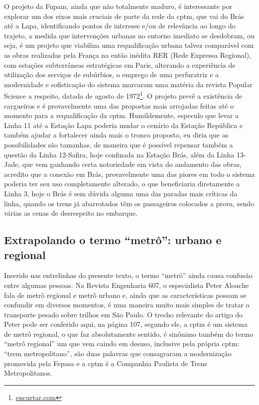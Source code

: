 \documentclass[11pt,fleqn]{book} %
\begin{document}
O projeto da Fupam, ainda que não totalmente maduro, é interessante por explorar um dos eixos mais cruciais de parte da rede da \gls{cptm}, que vai do Brás até a Lapa, identificando pontos de interesse e/ou de relevância ao longo do trajeto, a medida que intervenções urbanas no entorno imediato se desdobram, ou seja, é um projeto que viabiliza uma requalificação urbana talvez comparável com as obras realizadas pela França na então inédita RER (Rede Expressa Regional), com estações subterrâneas estratégicas em Paris, alterando a experiência de utilização dos serviços de subúrbios, o emprego de uma perfuratriz e a modernidade e sofisticação do sistema marcaram uma matéria da revista Popular Science a respeito, datada de agosto de 1972\footnote{\url{encurtar.com}}. O projeto prevê a existência de cargueiros e é provavelmente uma das propostas mais arrojadas feitas até o momento para a requalificação da \gls{cptm}. Humildemente, especulo que levar a Linha 11 até a Estação Lapa poderia mudar o cenário da Estação República e também ajudar a fortalecer ainda mais o tronco proposto, eu diria que as possibilidades são tamanhas, de maneira que é possível repensar também a questão da Linha 12-Safira, hoje confinada na Estação Brás, além da Linha 13-Jade, que vem ganhando certa notoriedade em vista do andamento das obras, acredito que a conexão em Brás, provavelmente uma das piores em todo o sistema poderia ter seu uso completamente alterado, o que beneficiaria diretamente a Linha 3, hoje o Brás é sem dúvida alguma uma das paradas mais críticas da linha, quando os trens já abarrotados têm os passageiros colocados a prova, sendo várias as cenas de desrespeito no embarque.

\subsection{Extrapolando o termo ``metrô'': urbano e regional}

Inserido nas entrelinhas do presente texto, o termo ``metrô'' ainda causa confusão entre algumas pessoas. Na Revista Engenharia 607, o especialista Peter Alouche fala de metrô regional e metrô urbano e, ainda que as características possam se confundir em diversos momentos, é uma maneira muito mais simples de tratar o transporte pesado sobre trilhos em São Paulo. O trecho relevante do artigo do Peter pode ser conferido aqui, na página 107, segundo ele, a \gls{cptm} é um sistema de metrô regional, o que faz absolutamente sentido, é sinônimo também do termo “metrô regional” um que vem caindo em desuso, inclusive pela própria \gls{cptm}: “trem metropolitano”, são duas palavras que consagraram a modernização promovida pela Fepasa e a \gls{cptm} é a Companhia Paulista de Trens Metropolitanos.
\end{document}

